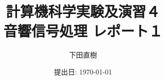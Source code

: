 \documentclass[a4paper,11pt]{jsarticle}
\begin{document}
\title{
  計算機科学実験及演習４	\\   %
  \large{音響信号処理 レポート１}	%
}
\author{下田直樹}
\date{提出日: \today}
\maketitle

\tableofcontents
\clearpage

\section{}
\end{document}
